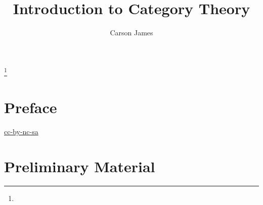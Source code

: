 \documentclass{book}
\begin{document}
	
	\frontmatter
	
	\title{Introduction to Category Theory}
	
	
	\author{Carson James}
	\thanks{}
	
	\date{}
	
	\maketitle
	
	
	\setcounter{page}{4}
	
	\tableofcontents
	\printunsrtglossary[type=symbols,style=long,title={Notation}]
	
	
	\mainmatter
	
	\chapter*{Preface}
	
	\begin{flushleft}
		\href{https://creativecommons.org/licenses/by-nc-sa/4.0/legalcode.txt}{cc-by-nc-sa}
	\end{flushleft}

	\newpage
	
	
	
	
	
	
	
	
	
	
	
	
	
	
	
	
	\chapter{Preliminary Material}
	
\end{document}
